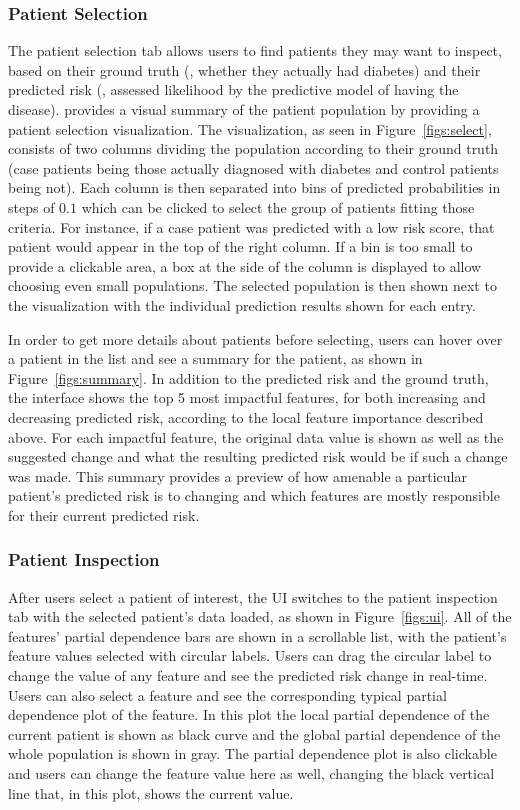 \subsubsection{Patient Selection}

The patient selection tab allows users to find patients they may want to inspect, based on their ground truth (\eg, whether they actually had diabetes) and their predicted risk (\eg, assessed likelihood by the predictive model of having the disease).  \prospector provides a visual summary of the patient population by providing a patient selection visualization. The visualization, as seen in Figure~\ref{figs:select}, consists of two columns dividing the population according to their ground truth
(case patients being those actually diagnosed with diabetes and control patients being not).
Each column is then separated into bins of predicted probabilities in steps of $0.1$
which can be clicked to select the group of patients fitting those criteria.  For instance, if a case patient was predicted with a low risk score, that patient would appear in the top of the right column.  If a bin is too small to provide a clickable area, a box at the side of the column is displayed to allow choosing even small populations.  The selected population is then shown next to the visualization with the individual prediction results shown for each entry.

In order to get more details about patients before selecting, users can hover over a patient in the list and see a summary for the patient, as shown in Figure~\ref{figs:summary}.
In addition to the predicted risk and the ground truth, the interface shows the top 5 most impactful features, for both increasing and decreasing predicted risk, according to the local feature importance described above.  For each impactful feature, the original data value is shown as well as the suggested change and what the resulting predicted risk would be if such a change was made.  This summary provides a preview of how amenable a particular patient's predicted risk is to changing and which features are mostly responsible for their current predicted risk.

\subsubsection{Patient Inspection}

After users select a patient of interest, the UI switches to the
patient inspection tab with the selected patient's data loaded, as shown in Figure~\ref{figs:ui}.
All of the features' partial dependence bars are shown in a scrollable list, with the patient's feature values selected with circular labels.
Users can drag the circular label to change the value of any feature and see the predicted risk change in real-time.
Users can also select a feature and see the corresponding typical partial dependence plot of the feature.
In this plot the local partial dependence of the current patient is shown as
black curve and the global partial dependence of the whole population is shown
in gray. The partial dependence plot is also clickable and users can change the feature value here as well, changing the black vertical line that, in this plot, shows the current value.  

